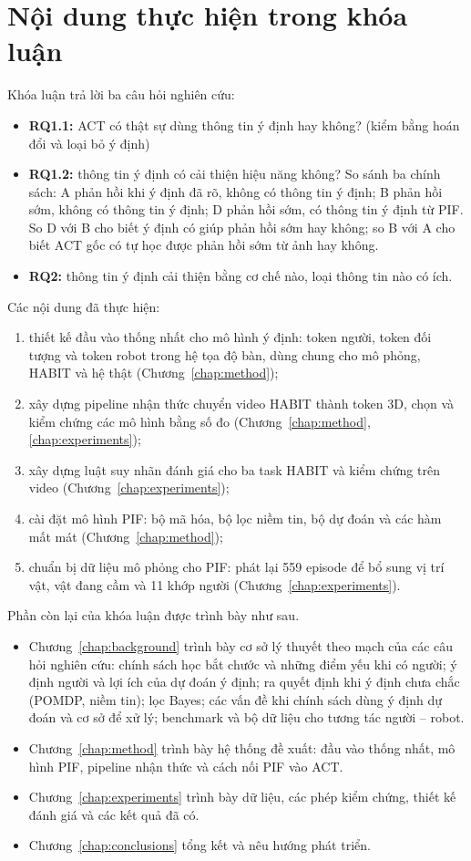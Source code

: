 \section{Nội dung thực hiện trong khóa luận}
\label{sec:intro-content}

Khóa luận trả lời ba câu hỏi nghiên cứu:
\begin{itemize}
  \item \textbf{RQ1.1:} ACT có thật sự dùng thông tin ý định hay không? (kiểm bằng hoán đổi và loại bỏ ý định)
  \item \textbf{RQ1.2:} thông tin ý định có cải thiện hiệu năng không? So sánh ba chính sách: A phản hồi khi ý định đã rõ, không có thông tin ý định; B phản hồi sớm, không có thông tin ý định; D phản hồi sớm, có thông tin ý định từ PIF. So D với B cho biết ý định có giúp phản hồi sớm hay không; so B với A cho biết ACT gốc có tự học được phản hồi sớm từ ảnh hay không.
  \item \textbf{RQ2:} thông tin ý định cải thiện bằng cơ chế nào, loại thông tin nào có ích.
\end{itemize}

Các nội dung đã thực hiện:
\begin{enumerate}
  \item thiết kế đầu vào thống nhất cho mô hình ý định: token người, token đối tượng và token robot trong hệ tọa độ bàn, dùng chung cho mô phỏng, HABIT và hệ thật (Chương~\ref{chap:method});
  \item xây dựng pipeline nhận thức chuyển video HABIT thành token 3D, chọn và kiểm chứng các mô hình bằng số đo (Chương~\ref{chap:method}, \ref{chap:experiments});
  \item xây dựng luật suy nhãn đánh giá cho ba task HABIT và kiểm chứng trên video (Chương~\ref{chap:experiments});
  \item cài đặt mô hình PIF: bộ mã hóa, bộ lọc niềm tin, bộ dự đoán và các hàm mất mát (Chương~\ref{chap:method});
  \item chuẩn bị dữ liệu mô phỏng cho PIF: phát lại 559 episode để bổ sung vị trí vật, vật đang cầm và 11 khớp người (Chương~\ref{chap:experiments}).
\end{enumerate}

Phần còn lại của khóa luận được trình bày như sau.
\begin{itemize}
  \item Chương~\ref{chap:background} trình bày cơ sở lý thuyết theo mạch của các câu hỏi nghiên cứu: chính sách học bắt chước và những điểm yếu khi có người; ý định người và lợi ích của dự đoán ý định; ra quyết định khi ý định chưa chắc (POMDP, niềm tin); lọc Bayes; các vấn đề khi chính sách dùng ý định dự đoán và cơ sở để xử lý; benchmark và bộ dữ liệu cho tương tác người -- robot.
  \item Chương~\ref{chap:method} trình bày hệ thống đề xuất: đầu vào thống nhất, mô hình PIF, pipeline nhận thức và cách nối PIF vào ACT.
  \item Chương~\ref{chap:experiments} trình bày dữ liệu, các phép kiểm chứng, thiết kế đánh giá và các kết quả đã có.
  \item Chương~\ref{chap:conclusions} tổng kết và nêu hướng phát triển.
\end{itemize}
